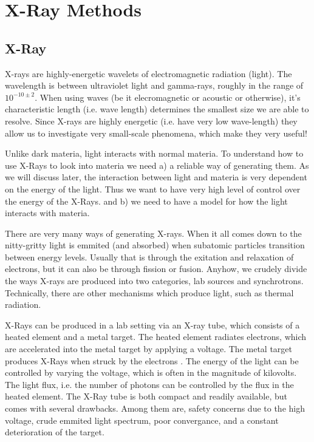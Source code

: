 \chapter{X-Ray Methods}

\section{X-Ray}
X-rays are highly-energetic wavelets of electromagnetic radiation (light). The wavelength is between ultraviolet light and gamma-rays, roughly in the range of $10^{-10\pm 2}$. When using waves (be it elecromagnetic or acoustic or otherwise), it's characteristic length (i.e. wave length) determines the smallest size we are able to resolve. Since X-rays are highly energetic (i.e. have very low wave-length) they allow us to investigate very small-scale phenomena, which make they very useful!

Unlike dark materia, light interacts with normal materia. To understand how to use X-Rays to look into materia we need a) a reliable way of generating them. As we will discuss later, the interaction between light and materia is very dependent on the energy of the light. Thus we want to have very high level of control over the energy of the X-Rays. and b) we need to have a model for how the light interacts with materia.

There are very many ways of generating X-rays. When it all comes down to the nitty-gritty light is emmited (and absorbed) when subatomic particles transition between energy levels. Usually that is through the exitation and relaxation of electrons, but it can also be through fission or fusion. Anyhow, we crudely divide the ways X-rays are produced into two categories, lab sources and synchrotrons. Technically, there are other mechanisms which produce light, such as thermal radiation. 

X-Rays can be produced in a lab setting via an X-ray tube, which consists of a heated element and a metal target. The heated element radiates electrons, which are accelerated into the metal target by applying a voltage. The metal target produces X-Rays when struck by the electrons \cite{behling2021modern}. The energy of the light can be controlled by varying the voltage, which is often in the magnitude of kilovolts. The light flux, i.e. the number of photons can be controlled by the flux in the heated element. The X-Ray tube is both compact and readily available, but comes with several drawbacks. Among them are, safety concerns due to the high voltage, crude emmited light spectrum, poor convergance, and a constant deterioration of the target.

